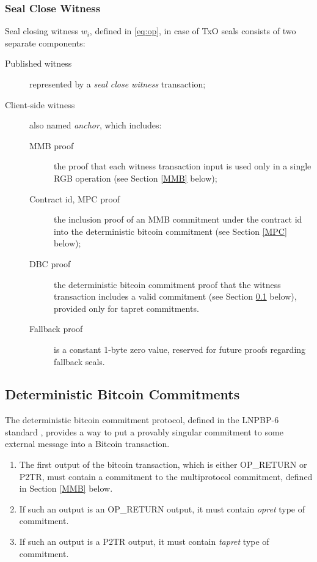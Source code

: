 \documentclass[9pt,oneside]{amsart}
\begin{document}
\begin{multicols}{2}
\subsubsection{Seal Close Witness}\label{Witness}

Seal closing witness $w_i$, defined in \ref{eq:op}, in case of TxO seals consists of two
separate components:
\begin{description}
\item[Published witness] represented by a \emph{seal close witness} transaction;
\item[Client-side witness] also named \emph{anchor},
    which includes:
    \begin{description}
    \item[MMB proof] the proof that each witness transaction input
        is used only in a single RGB operation (see Section \ref{MMB} below);
    \item[Contract id, MPC proof] the inclusion proof of an MMB commitment under the contract id
        into the deterministic bitcoin commitment (see Section \ref{MPC} below);
    \item[DBC proof] the deterministic bitcoin commitment proof that the witness transaction
        includes a valid commitment (see Section \ref{DBC} below), provided only
        for tapret commitments.
    \item[Fallback proof] is a constant 1-byte zero value,
        reserved for future proofs regarding fallback seals.
    \end{description}
\end{description}


\subsection{Deterministic Bitcoin Commitments}\label{DBC}

The deterministic bitcoin commitment protocol, defined in the LNPBP-6 standard \cite{LNPBP6},
provides a way to put a provably singular commitment to some external message
into a Bitcoin transaction.

\begin{enumerate}
\item The first output of the bitcoin transaction, which is either OP\_RETURN or P2TR,
    must contain a commitment to the multiprotocol commitment, defined in Section \ref{MMB} below.
\item If such an output is an OP\_RETURN output, it must contain \emph{opret} type of commitment.
\item If such an output is a P2TR output, it must contain \emph{tapret} type of commitment.
\end{enumerate}


\end{multicols}
\end{document}
